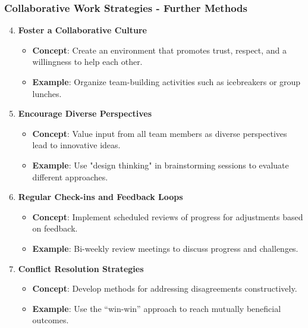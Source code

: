 \documentclass[aspectratio=169]{beamer}
\begin{document}
\begin{frame}[fragile]
    \frametitle{Collaborative Work Strategies - Further Methods}
    \begin{enumerate}\setcounter{enumi}{3} %
        \item \textbf{Foster a Collaborative Culture}
        \begin{itemize}
            \item \textbf{Concept}: Create an environment that promotes trust, respect, and a willingness to help each other.
            \item \textbf{Example}: Organize team-building activities such as icebreakers or group lunches.
        \end{itemize}

        \item \textbf{Encourage Diverse Perspectives}
        \begin{itemize}
            \item \textbf{Concept}: Value input from all team members as diverse perspectives lead to innovative ideas.
            \item \textbf{Example}: Use "design thinking" in brainstorming sessions to evaluate different approaches.
        \end{itemize}

        \item \textbf{Regular Check-ins and Feedback Loops}
        \begin{itemize}
            \item \textbf{Concept}: Implement scheduled reviews of progress for adjustments based on feedback.
            \item \textbf{Example}: Bi-weekly review meetings to discuss progress and challenges.
        \end{itemize}

        \item \textbf{Conflict Resolution Strategies}
        \begin{itemize}
            \item \textbf{Concept}: Develop methods for addressing disagreements constructively.
            \item \textbf{Example}: Use the “win-win” approach to reach mutually beneficial outcomes.
        \end{itemize}
    \end{enumerate}
\end{frame}
\end{document}
